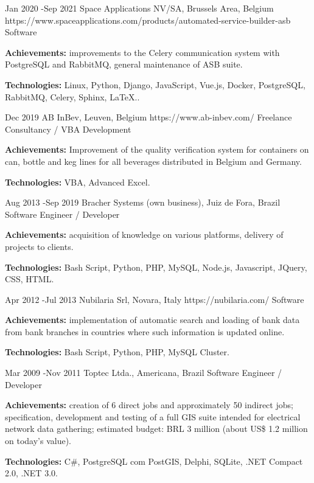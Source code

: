 \documentclass[10pt]{article} %
\begin{document}
\job
{Jan 2020 -}{Sep 2021}
{Space Applications NV/SA, Brussels Area, Belgium}
{https://www.spaceapplications.com/products/automated-service-builder-asb}
{Software }
{\rule{0mm}{2mm}\textbf{Achievements:} improvements to the Celery communication system with PostgreSQL and RabbitMQ, general maintenance of ASB suite.\\
\rule{0mm}{3mm}\textbf{Technologies:} Linux, Python, Django, JavaScript, Vue.js, Docker, PostgreSQL, RabbitMQ, Celery, Sphinx, LaTeX..}

\job
{Dec 2019}{}
{AB InBev, Leuven, Belgium}
{https://www.ab-inbev.com/}
{Freelance Consultancy / VBA Development}
{\rule{0mm}{2mm}\textbf{Achievements:} Improvement of the quality verification system for containers on can, bottle and keg lines for all beverages distributed in Belgium and Germany.\\
\rule{0mm}{3mm}\textbf{Technologies:} VBA, Advanced Excel.}

\job
{Aug 2013 -}{Sep 2019}
{Bracher Systems (own business), Juiz de Fora, Brazil}
{}
{Software Engineer / Developer}
{\rule{0mm}{2mm}\textbf{Achievements:} acquisition of knowledge on various platforms, delivery of projects to clients.\\
\rule{0mm}{3mm}\textbf{Technologies:} Bash Script, Python, PHP, MySQL, Node.js, Javascript, JQuery, CSS, HTML.}

\job
{Apr 2012 -}{Jul 2013}
{Nubilaria Srl, Novara, Italy}
{https://nubilaria.com/}
{Software }
{\rule{0mm}{2mm}\textbf{Achievements:} implementation of automatic search and loading of bank data from bank branches in countries where such information is updated online.\\
\rule{0mm}{3mm}\textbf{Technologies:} Bash Script, Python, PHP, MySQL Cluster.}

\job
{Mar 2009 -}{Nov 2011}
{Toptec Ltda., Americana, Brazil}
{}
{Software Engineer / Developer}
{\rule{0mm}{2mm}\textbf{Achievements:} creation of 6 direct jobs and approximately 50 indirect jobs; specification, development and testing of a full GIS suite intended for electrical network data gathering; estimated budget: BRL 3 million (about US\$ 1.2 million on today’s value). \\
\rule{0mm}{3mm}\textbf{Technologies:} C\#, PostgreSQL com PostGIS, Delphi, SQLite, .NET Compact 2.0, .NET 3.0.}




\end{document}

